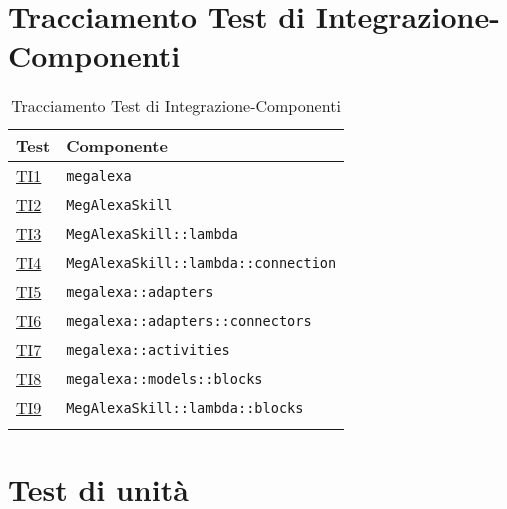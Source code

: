 \section{Tracciamento Test di Integrazione-Componenti}
\normalsize
\begin{longtable}{|>{\centering}m{3cm}|m{9cm}<{\centering}|}
\hline
\textbf{Test} & \textbf{Componente}\\
\hline
\endhead
\hyperlink{TI1}{TI1} & \texttt{megalexa}\\ \hline
\hyperlink{TI2}{TI2} & \texttt{MegAlexaSkill}\\ \hline
\hyperlink{TI3}{TI3} & \texttt{MegAlexaSkill::lambda}\\ \hline
\hyperlink{TI4}{TI4} & \texttt{MegAlexaSkill::lambda::connection}\\ \hline
\hyperlink{TI5}{TI5} & \texttt{megalexa::adapters}\\ \hline
\hyperlink{TI6}{TI6} & \texttt{megalexa::adapters::connectors}\\ \hline
\hyperlink{TI7}{TI7} & \texttt{megalexa::activities}\\ \hline
\hyperlink{TI8}{TI8} & \texttt{megalexa::models::blocks}\\ \hline
\hyperlink{TI9}{TI9} & \texttt{MegAlexaSkill::lambda::blocks}\\ \hline
\caption[Tracciamento Test di Integrazione-Componenti]{Tracciamento Test di Integrazione-Componenti}
\label{tabella:ts-requi}
\end{longtable}
\clearpage


\section{Test di unità}

